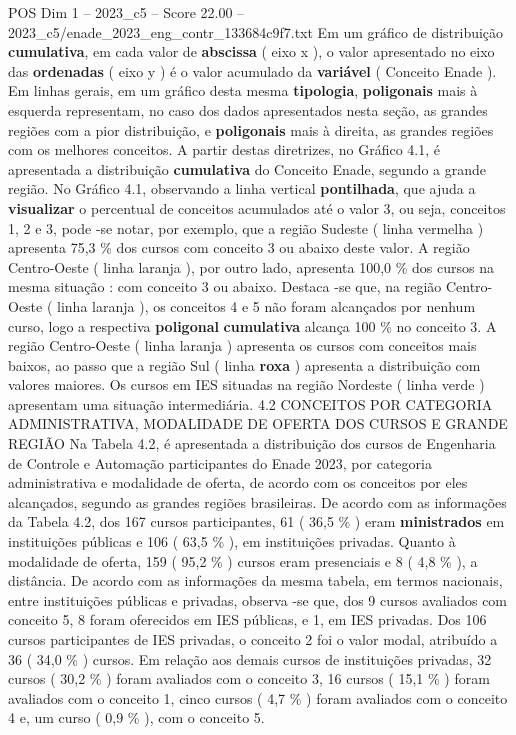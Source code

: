 \begin{textsample}{POS Dim 1 – 2023\_c5 – Score 22.00 – 2023\_c5/enade\_2023\_eng\_contr\_133684c9f7.txt}
Em um gráfico de distribuição \textbf{cumulativa}, em cada valor de \textbf{abscissa} ( eixo x ), o valor apresentado no eixo das \textbf{ordenadas} ( eixo y ) é o valor acumulado da \textbf{variável} ( Conceito Enade ).
Em linhas gerais, em um gráfico desta mesma \textbf{tipologia}, \textbf{poligonais} mais à esquerda representam, no caso dos dados apresentados nesta seção, as grandes regiões com a pior distribuição, e \textbf{poligonais} mais à direita, as grandes regiões com os melhores conceitos.
A partir destas diretrizes, no Gráfico 4.1, é apresentada a distribuição \textbf{cumulativa} do Conceito Enade, segundo a grande região.
No Gráfico 4.1, observando a linha vertical \textbf{pontilhada}, que ajuda a \textbf{visualizar} o percentual de conceitos acumulados até o valor 3, ou seja, conceitos 1, 2 e 3, pode -se notar, por exemplo, que a região Sudeste ( linha vermelha ) apresenta 75,3 \% dos cursos com conceito 3 ou abaixo deste valor.
A região Centro-Oeste ( linha laranja ), por outro lado, apresenta 100,0 \% dos cursos na mesma situação : com conceito 3 ou abaixo.
Destaca -se que, na região Centro-Oeste ( linha laranja ), os conceitos 4 e 5 não foram alcançados por nenhum curso, logo a respectiva \textbf{poligonal} \textbf{cumulativa} alcança 100 \% no conceito 3.
A região Centro-Oeste ( linha laranja ) apresenta os cursos com conceitos mais baixos, ao passo que a região Sul ( linha \textbf{roxa} ) apresenta a distribuição com valores maiores.
Os cursos em IES situadas na região Nordeste ( linha verde ) apresentam uma situação intermediária. 4.2 CONCEITOS POR CATEGORIA ADMINISTRATIVA, MODALIDADE DE OFERTA DOS CURSOS E GRANDE REGIÃO Na Tabela 4.2, é apresentada a distribuição dos cursos de Engenharia de Controle e Automação participantes do Enade 2023, por categoria administrativa e modalidade de oferta, de acordo com os conceitos por eles alcançados, segundo as grandes regiões brasileiras.
De acordo com as informações da Tabela 4.2, dos 167 cursos participantes, 61 ( 36,5 \% ) eram \textbf{ministrados} em instituições públicas e 106 ( 63,5 \% ), em instituições privadas.
Quanto à modalidade de oferta, 159 ( 95,2 \% ) cursos eram presenciais e 8 ( 4,8 \% ), a distância.
De acordo com as informações da mesma tabela, em termos nacionais, entre instituições públicas e privadas, observa -se que, dos 9 cursos avaliados com conceito 5, 8 foram oferecidos em IES públicas, e 1, em IES privadas.
Dos 106 cursos participantes de IES privadas, o conceito 2 foi o valor modal, atribuído a 36 ( 34,0 \% ) cursos.
Em relação aos demais cursos de instituições privadas, 32 cursos ( 30,2 \% ) foram avaliados com o conceito 3, 16 cursos ( 15,1 \% ) foram avaliados com o conceito 1, cinco cursos ( 4,7 \% ) foram avaliados com o conceito 4 e, um curso ( 0,9 \% ), com o conceito 5.

\end{textsample}
